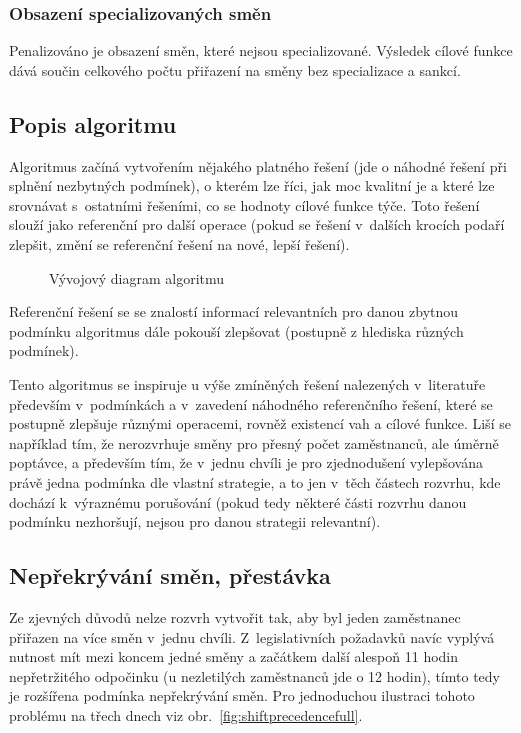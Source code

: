 \documentclass[twoside]{ctuthesis}
\begin{document}
\subsubsection{Obsazení specializovaných směn}
Penalizováno je obsazení směn, které nejsou specializované. Výsledek cílové funkce dává součin celkového počtu přiřazení na směny bez specializace a sankcí.

\subsection{Popis algoritmu}
Algoritmus začíná vytvořením nějakého platného řešení (jde o náhodné řešení při splnění nezbytných podmínek), o kterém lze říci, jak moc kvalitní je a které lze srovnávat s~ostatními řešeními, co se hodnoty cílové funkce týče. Toto řešení slouží jako referenční pro další operace (pokud se řešení v~dalších krocích podaří zlepšit, změní se referenční řešení na nové, lepší řešení).

\begin{figure}
	
	\caption{Vývojový diagram algoritmu}
	\label{fig:algorithmflow}
\end{figure}

Referenční řešení se se znalostí informací relevantních pro danou zbytnou podmínku algoritmus dále pokouší zlepšovat (postupně z hlediska různých podmínek).

Tento algoritmus se inspiruje u výše zmíněných řešení nalezených v~literatuře především v~podmínkách a v~zavedení náhodného referenčního řešení, které se postupně zlepšuje různými operacemi, rovněž existencí vah a cílové funkce. Liší se například tím, že nerozvrhuje směny pro přesný počet zaměstnanců, ale úměrně poptávce, a především tím, že v~jednu chvíli je pro zjednodušení vylepšována právě jedna podmínka dle vlastní strategie, a to jen v~těch částech rozvrhu, kde dochází k~výraznému porušování (pokud tedy některé části rozvrhu danou podmínku nezhoršují, nejsou pro danou strategii relevantní).

\subsection{Nepřekrývání směn, přestávka}
Ze zjevných důvodů nelze rozvrh vytvořit tak, aby byl jeden zaměstnanec přiřazen na více směn v~jednu chvíli. Z~legislativních požadavků navíc vyplývá nutnost mít mezi koncem jedné směny a začátkem další alespoň 11 hodin nepřetržitého odpočinku (u nezletilých zaměstnanců jde o 12 hodin), tímto tedy je rozšířena podmínka nepřekrývání směn. Pro jednoduchou ilustraci tohoto problému na třech dnech viz obr.~\ref{fig:shiftprecedencefull}.
\end{document}
